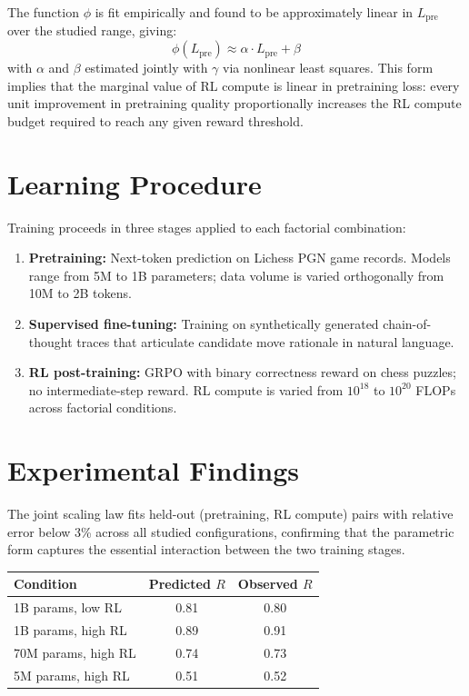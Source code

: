 \documentclass[10pt,twocolumn]{article}
\begin{document}
The function $\phi$ is fit empirically and found to be approximately
linear in $L_{\text{pre}}$ over the studied range, giving:
\[
\phi(L_{\text{pre}}) \approx \alpha \cdot L_{\text{pre}} + \beta
\]
with $\alpha$ and $\beta$ estimated jointly with $\gamma$ via nonlinear
least squares.
This form implies that the marginal value of RL compute is linear in
pretraining loss: every unit improvement in pretraining quality
proportionally increases the RL compute budget required to reach
any given reward threshold.

\section{Learning Procedure}

Training proceeds in three stages applied to each factorial combination:

\begin{enumerate}[itemsep=2pt,parsep=0pt]
  \item \textbf{Pretraining:} Next-token prediction on Lichess PGN
    game records.
    Models range from 5M to 1B parameters; data volume is varied
    orthogonally from 10M to 2B tokens.
  \item \textbf{Supervised fine-tuning:} Training on synthetically
    generated chain-of-thought traces that articulate candidate
    move rationale in natural language.
  \item \textbf{RL post-training:} GRPO with binary correctness reward
    on chess puzzles; no intermediate-step reward.
    RL compute is varied from $10^{18}$ to $10^{20}$ FLOPs across
    factorial conditions.
\end{enumerate}

\section{Experimental Findings}

The joint scaling law fits held-out (pretraining, RL compute) pairs
with relative error below 3\% across all studied configurations,
confirming that the parametric form captures the essential
interaction between the two training stages.

\begin{center}
\small
\begin{tabular}{lcc}
\toprule
Condition & Predicted $R$ & Observed $R$ \\
\midrule
1B params, low RL & 0.81 & 0.80 \\
1B params, high RL & 0.89 & 0.91 \\
70M params, high RL & 0.74 & 0.73 \\
5M params, high RL & 0.51 & 0.52 \\
\bottomrule
\end{tabular}
\end{center}
\end{document}
